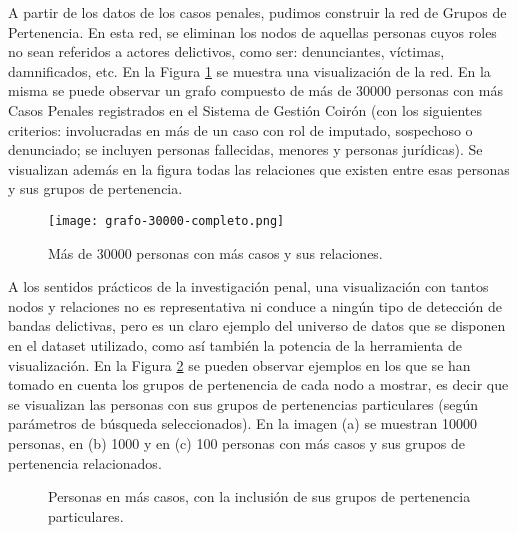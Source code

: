 A partir de los datos de los casos penales, pudimos construir la red de Grupos de Pertenencia. En esta red, se eliminan los nodos de aquellas personas cuyos roles no sean referidos a actores delictivos, como ser: denunciantes, víctimas, damnificados, etc. En la Figura \ref{fig:grafocompleto} se muestra una visualización de la red. En la misma se puede observar un grafo compuesto de más de 30000 personas con más Casos Penales registrados en el Sistema de Gestión Coirón (con los siguientes criterios: involucradas en más de un caso con rol de imputado, sospechoso o denunciado; se incluyen personas fallecidas, menores y personas jurídicas). Se visualizan además en la figura todas las relaciones que existen entre esas personas y sus grupos de pertenencia.
\vspace{-10pt}
\begin{figure}
	\centering
	\texttt{[image: grafo-30000-completo.png]}
	\caption{Más de 30000 personas con más casos y sus relaciones.} 
	\label{fig:grafocompleto}
\end{figure}
\vspace{-10pt}
A los sentidos prácticos de la investigación penal, una visualización con tantos nodos y relaciones no es representativa ni conduce a ningún tipo de detección de bandas delictivas, pero es un claro ejemplo del universo de datos que se disponen en el dataset utilizado, como así también la potencia de la herramienta de visualización. En la Figura \ref{fig:grafosCompletos} se pueden observar ejemplos en los que se han tomado en cuenta los grupos de pertenencia de cada nodo a mostrar, es decir que se visualizan las personas con sus grupos de pertenencias particulares (según parámetros de búsqueda seleccionados). En la imagen (a) se muestran 10000 personas, en (b) 1000 y en (c) 100 personas con más casos y sus grupos de pertenencia relacionados.
\vspace{-10pt}
\begin{figure}[htbp]
	\centering
	\centering
	\caption{ Personas en más casos, con la inclusión de sus grupos de pertenencia particulares.}
	\label{fig:grafosCompletos}
\end{figure}
